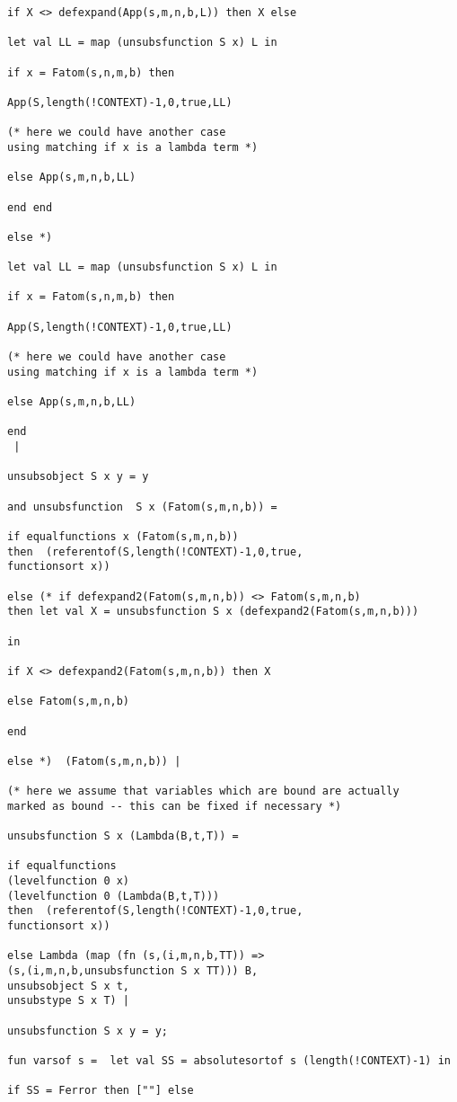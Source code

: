 \documentclass[12pt]{article}
\begin{document}
\begin{verbatim}
if X <> defexpand(App(s,m,n,b,L)) then X else

let val LL = map (unsubsfunction S x) L in

if x = Fatom(s,n,m,b) then

App(S,length(!CONTEXT)-1,0,true,LL)

(* here we could have another case
using matching if x is a lambda term *)

else App(s,m,n,b,LL)

end end

else *)

let val LL = map (unsubsfunction S x) L in

if x = Fatom(s,n,m,b) then

App(S,length(!CONTEXT)-1,0,true,LL)

(* here we could have another case
using matching if x is a lambda term *)

else App(s,m,n,b,LL)

end 
 |

unsubsobject S x y = y

and unsubsfunction  S x (Fatom(s,m,n,b)) =

if equalfunctions x (Fatom(s,m,n,b))  
then  (referentof(S,length(!CONTEXT)-1,0,true,
functionsort x))

else (* if defexpand2(Fatom(s,m,n,b)) <> Fatom(s,m,n,b)
then let val X = unsubsfunction S x (defexpand2(Fatom(s,m,n,b)))

in

if X <> defexpand2(Fatom(s,m,n,b)) then X

else Fatom(s,m,n,b)

end

else *)  (Fatom(s,m,n,b)) |

(* here we assume that variables which are bound are actually
marked as bound -- this can be fixed if necessary *)

unsubsfunction S x (Lambda(B,t,T)) =

if equalfunctions 
(levelfunction 0 x)
(levelfunction 0 (Lambda(B,t,T)))
then  (referentof(S,length(!CONTEXT)-1,0,true,
functionsort x))

else Lambda (map (fn (s,(i,m,n,b,TT)) => 
(s,(i,m,n,b,unsubsfunction S x TT))) B,
unsubsobject S x t,
unsubstype S x T) |

unsubsfunction S x y = y;

fun varsof s =  let val SS = absolutesortof s (length(!CONTEXT)-1) in 

if SS = Ferror then [""] else


\end{verbatim}
\end{document}
